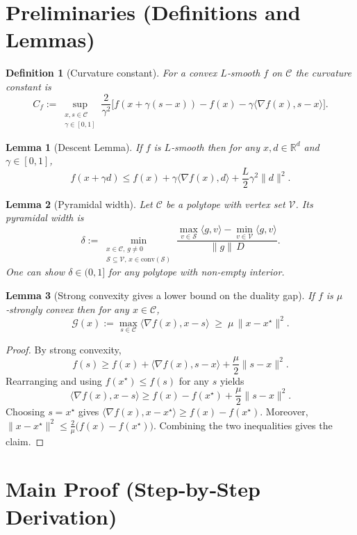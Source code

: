 \documentclass{article}
\newtheorem{lemma}{Lemma}
\newtheorem{definition}{Definition}
\newcommand{\gap}{\mathcal{G}}
\newcommand{\conv}{\mathrm{conv}}
\begin{document}
\newpage
\section*{Preliminaries (Definitions and Lemmas)}
\begin{definition}[Curvature constant]\label{def:curv}
For a convex $L$‑smooth $f$ on $\mathcal{C}$ the curvature constant is
\[
C_f:=\sup_{\substack{x,s\in\mathcal{C}\\ \gamma\in[0,1]}}
\frac{2}{\gamma^2}\bigl[f(x+\gamma(s-x))-f(x)-\gamma\langle\nabla f(x),s-x\rangle\bigr].
\]
\end{definition}
\begin{lemma}[Descent Lemma]\label{lem:descent}
If $f$ is $L$‑smooth then for any $x,d\in\mathbb{R}^d$ and $\gamma\in[0,1]$,
\[
f(x+\gamma d)\le f(x)+\gamma\langle\nabla f(x),d\rangle+\frac{L}{2}\gamma^2\|d\|^2 .
\]
\end{lemma}
\begin{lemma}[Pyramidal width]\label{lem:pyrwidth}
Let $\mathcal{C}$ be a polytope with vertex set $\mathcal{V}$. Its pyramidal width is
\[
\delta:=\min_{\substack{x\in\mathcal{C},\,g\neq0\\
    \mathcal{S}\subseteq\mathcal{V},\,x\in\conv(\mathcal{S})}}
\frac{\max_{v\in\mathcal{S}}\langle g,v\rangle-\min_{v\in\mathcal{V}}\langle g,v\rangle}{\|g\|\,D}.
\]
One can show $\delta\in(0,1]$ for any polytope with non‑empty interior. 
\end{lemma}
\begin{lemma}[Strong convexity gives a lower bound on the duality gap]\label{lem:gapstrong}
If $f$ is $\mu$‑strongly convex then for any $x\in\mathcal{C}$,
\[
\gap(x):=\max_{s\in\mathcal{C}}\langle \nabla f(x),x-s\rangle
\;\ge\; \mu\,\|x-x^\star\|^2 .
\]
\end{lemma}
\begin{proof}
By strong convexity,
\[
f(s)\ge f(x)+\langle\nabla f(x),s-x\rangle+\frac{\mu}{2}\|s-x\|^2.
\]
Rearranging and using $f(x^\star)\le f(s)$ for any $s$ yields
\[
\langle\nabla f(x),x-s\rangle\ge f(x)-f(x^\star)+\frac{\mu}{2}\|s-x\|^2 .
\]
Choosing $s=x^\star$ gives $\langle\nabla f(x),x-x^\star\rangle\ge f(x)-f(x^\star)$. Moreover,
$\|x-x^\star\|^2\le\frac{2}{\mu}\bigl(f(x)-f(x^\star)\bigr)$. Combining the two inequalities gives the claim. 
\end{proof}

\section*{Main Proof (Step‑by‑Step Derivation)}
\end{document}
